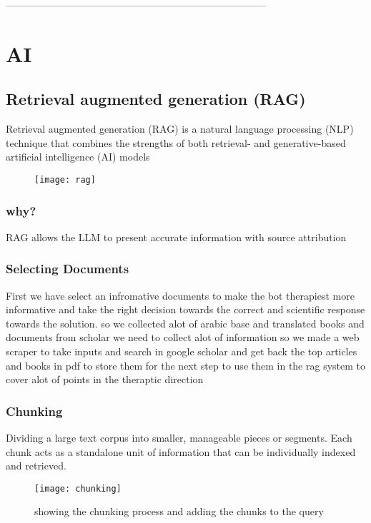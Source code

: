  ------------------------------------------------------------------------------
\chapter{AI} %
\section{Retrieval augmented generation (RAG)} %
Retrieval augmented generation (RAG) is a natural language processing (NLP) technique that combines the strengths of both retrieval- and generative-based artificial intelligence (AI) models
\begin{figure}[h]
\texttt{[image: rag]}
\centering
\end{figure}
\subsection*{why?}
RAG allows the LLM to present accurate information with source attribution
\subsection{Selecting Documents} %
First we have select an infromative documents to make the bot therapiest more informative and take the right decision towards the correct and scientific response towards the solution.
so we collected alot of arabic base and translated books and documents from scholar we need to collect alot of information so we made a web scraper to take inputs and search in google scholar and get back the top articles and books in pdf to store them for the next step to use them in the rag system to cover alot of points in the theraptic direction
\subsection{Chunking} 
Dividing a large text corpus into smaller, manageable pieces or segments. Each chunk acts as a standalone unit of information that can be individually indexed and retrieved.
\begin{figure}[h]
\texttt{[image: chunking]}
\caption{showing the chunking process and adding the chunks to the query}
\centering
\end{figure}

